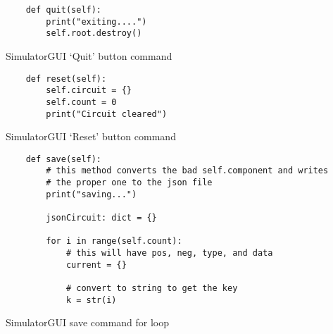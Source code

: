 \newpage
\begin{listing}[!ht]
    \begin{verbatim}
    def quit(self):
        print("exiting....")
        self.root.destroy()
    \end{verbatim}
    \caption{SimulatorGUI `Quit' button command}
    \label{sc:simgui-quit-btn-command}
\end{listing}

\newpage
\begin{listing}[!ht]
    \begin{verbatim}
    def reset(self):
        self.circuit = {}
        self.count = 0
        print("Circuit cleared")
    \end{verbatim}
    \caption{SimulatorGUI `Reset' button command}
    \label{sc:simgui-reset-btn-command}
\end{listing}

\newpage
\begin{listing}[!ht]
    \begin{verbatim}
    def save(self):
        # this method converts the bad self.component and writes 
        # the proper one to the json file
        print("saving...")
        
        jsonCircuit: dict = {}
        
        for i in range(self.count):
            # this will have pos, neg, type, and data
            current = {}
            
            # convert to string to get the key
            k = str(i)
    \end{verbatim}
    \caption{SimulatorGUI save command for loop}
    \label{sc:simgui-save-cmd-1}
\end{listing}

